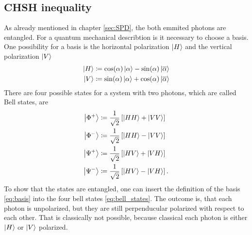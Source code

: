 \subsection{CHSH inequality}\label{sec:theory_CHSH}
As already mentioned in chapter \ref{sec:SPD}, the both emmited photons are entangled. For a quantum mechanical describtion is it necessary to choose a basis. One possibility for a basis is the horizontal polarization $\ket{H}$ and  the vertical polarization $\ket{V}$
\begin{subequations}
\label{eq:basis}
\begin{align}
\ket{H}  & \coloneqq \mathrm{cos}(\alpha) \ket{\alpha} -  \mathrm{sin}(\alpha) \ket{\overline{\alpha}}
\label{eq:basis:H}\\
\ket{V}  & \coloneqq \mathrm{sin}(\alpha) \ket{\alpha} +  \mathrm{cos}(\alpha) \ket{\overline{\alpha}}
\label{eq:basis:V}
\end{align}
\end{subequations}
There are four possible states for a system with two photons, which are called Bell states, are
\begin{subequations}
\label{eq:bell_states}
\begin{align}
\ket{\Phi^{+}} & \coloneqq \frac{1}{\sqrt{2}} \left[\ket{HH} + \ket{VV} \right]  
\label{eq:bell_states:phip}\\  
\ket{\Phi^{-}} & \coloneqq \frac{1}{\sqrt{2}} \left[\ket{HH} - \ket{VV} \right]  
\label{eq:bell_states:phim}\\
\ket{\Psi^{+}} & \coloneqq \frac{1}{\sqrt{2}} \left[\ket{HV} + \ket{VH} \right] 
\label{eq:bell_states:psip}\\  
\ket{\Psi^{-}} & \coloneqq \frac{1}{\sqrt{2}} \left[\ket{HV} - \ket{VH} \right].
\label{eq:bell_states:psim}
\end{align}
\end{subequations}
To show that the states are entangled, one can insert the definition of the basis \eqref{eq:basis} into the four bell states \eqref{eq:bell_states}. The outcome is, that each photon is unpolarized, but they are still perpenducular polarized with respect to each other. 
That is classically not possible, because classical each photon is either $\ket{H}$  or $\ket{V}$ polarized. 



